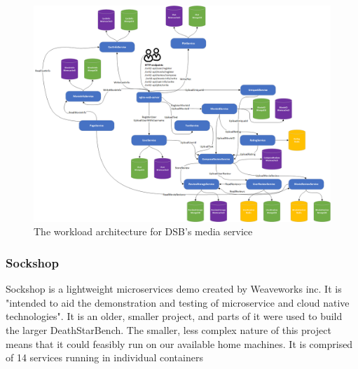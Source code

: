 \begin{figure} 
\centering 
\includegraphics[width=\columnwidth]{Figures/Charts/media_microservices_architecture.png}
\caption{The workload architecture for DSB's media service}
\label{DSB-media}
\end{figure}


\subsubsection{Sockshop}
Sockshop is a lightweight microservices demo created by Weaveworks inc. It is "intended to aid the demonstration and testing of microservice and cloud native technologies". \cite*{Weaveworks}
It is an older, smaller project, and parts of it were used to build the larger DeathStarBench. \cite*{Gan2019}
The smaller, less complex nature of this project means that it could feasibly run on our available home machines. 
It is comprised of 14 services running in individual containers
